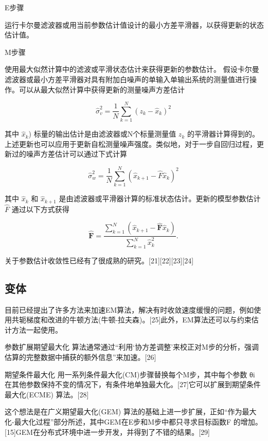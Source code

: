 E步骤

运行卡尔曼滤波器或用当前参数估计值设计的最小方差平滑器，以获得更新的状态估计值。

M步骤

使用最大似然计算中的滤波或平滑状态估计来获得更新的参数估计。
假设卡尔曼滤波器或最小方差平滑器对具有附加白噪声的单输入单输出系统的测量值进行操作。可以从最大似然计算中获得更新的测量噪声方差估计

\begin{equation}
\hat\sigma_v^2 = \frac{1}{N} \sum_{k=1}^{N} \left( z_k - \hat{x}_k \right)^2~
\end{equation}

其中 $\hat{x}_k$) 标量的输出估计是由滤波器或N个标量测量值 $z_k$ 的平滑器计算得到的。上述更新也可以应用于更新自松测量噪声强度。类似地，对于一步自回归过程，更新过的噪声方差估计可以通过下式计算

\begin{equation}
\hat\sigma_w^2 = \frac{1}{N} \sum_{k=1}^{N} \left( \hat{x}_{k+1} - \hat{F} \hat{x}_k \right)^2~
\end{equation}

其中 $\hat{x}_k$ 和 $\hat{x}_{k+1}$ 是由滤波器或平滑器计算的标准状态估计。更新的模型参数估计 $\hat{F}$ 通过以下方式获得

\begin{equation}
\hat{\mathbf{F}} = \frac{\sum_{k=1}^{N} (\hat{x}_{k+1} - \hat{\mathbf{F}} \hat{x}_{k})}{\sum_{k=1}^{N} \hat{x}_{k}^{2}}.~
\end{equation}

关于参数估计收敛性已经有了很成熟的研究。[21][22][23][24]

\subsection{变体}

目前已经提出了许多方法来加速EM算法，解决有时收敛速度缓慢的问题，例如使用共轭梯度和改进的牛顿方法(牛顿-拉夫森)。[25]此外，EM算法还可以与约束估计方法一起使用。

参数扩展期望最大化 算法通常通过“利用‘协方差调整’来校正对M步的分析，强调估算的完整数据中捕获的额外信息”来加速。[26]

期望条件最大化 用一系列条件最大化(CM)步骤替换每个M步，其中每个参数 θi 在其他参数保持不变的情况下，有条件地单独最大化。[27]它可以扩展到期望条件最大化(ECME) 算法。[28]

这个想法是在广义期望最大化(GEM) 算法的基础上进一步扩展，正如“作为最大化-最大化过程”部分所述，其中GEM在E步和M步中都只寻求目标函数F 的增加。[15]GEM在分布式环境中进一步开发，并得到了不错的结果。[29]

